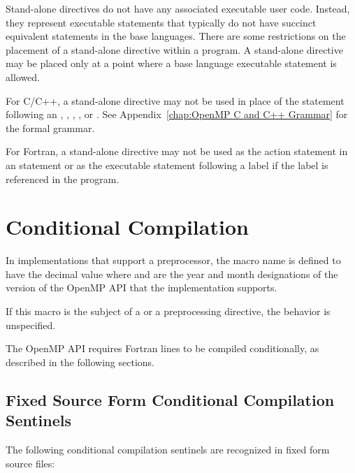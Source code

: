 \descr
Stand-alone directives do not have any associated executable user code. Instead, they 
represent executable statements that typically do not have succinct equivalent statements 
in the base languages. There are some restrictions on the placement of a stand-alone 
directive within a program. A stand-alone directive may be placed only at a point where 
a base language executable statement is allowed.

\restrictions
\ccppspecificstart
For C/C++, a stand-alone directive may not be used in place of the statement following 
an , , , , or . 
See Appendix~\ref{chap:OpenMP C and C++ Grammar} for the formal grammar.
\ccppspecificend

\fortranspecificstart
For Fortran, a stand-alone directive may not be used as the action statement in an  
statement or as the executable statement following a label if the label is referenced in 
the program.
\fortranspecificend









\section{Conditional Compilation}
\label{sec:Conditional Compilation}
In implementations that support a preprocessor, the  macro name is defined to 
have the decimal value  where  and  are the year and month designations 
of the version of the OpenMP API that the implementation supports. 

If this macro is the subject of a  or a  preprocessing directive, the 
behavior is unspecified.

\fortranspecificstart
The OpenMP API requires Fortran lines to be compiled conditionally, as described in 
the following sections.








\subsection{Fixed Source Form Conditional Compilation Sentinels}
\label{subsec:Fixed Source Form Conditional Compilation Sentinels}
The following conditional compilation sentinels are recognized in fixed form source 
files:

